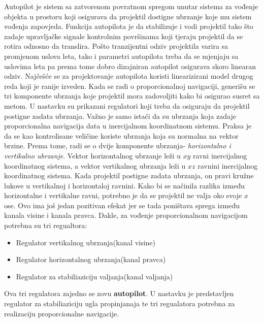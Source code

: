 Autopilot je sistem sa zatvorenom povratnom spregom unutar sistema za vođenje objekta 
u prostoru koji osigurava da projektil dostigne ubrzanje koje mu sistem vođenja zapovjeda. 
Funkcija autopilota je da stabilizuje i vodi projektil tako što zadaje upravljačke signale kontrolnim 
površinama koji tjeraju projektil da se rotira odnosno da translira.  
Pošto tranzijentni odziv projektila varira sa promjenom uslova leta, tako i parametri 
autopilota treba da se mjenjaju sa uslovima leta pa prema tome dobro 
dizajniran autopilot osigurava skoro linearan odziv. Najčešće se za projektovanje 
autopilota koristi linearizirani model drugog reda koji je ranije izveden. 
Kada se radi o proporcionalnoj navigaciji, generišu se tri komponente ubrzanja koje projektil mora 
zadovoljiti kako bi osigurao susret sa metom. U nastavku su prikazani regulatori koji 
treba da osiguraju da projektil postigne zadata ubrzanja. Važno je samo istaći 
da su ubrzanja koja zadaje proporcionalna navigacija data u inercijalnom koordinatnom sistemu. Praksa 
je da se kao kontrolisane veličine koriste ubrzanja koja su normalna na vektor brzine. Prema tome, 
radi se o dvije komponente ubrzanja- \textit{horizontalno i vertikalno ubrzanje}. Vektor horizontalnog ubrzanje 
leži u $xy$ ravni inercijalnog koordinatnog sistema, a vektor vertikalnog ubrzanja leži u $xz$ ravnini inercijalnog
koordinatnog sistema. Kada projektil postigne zadata ubrzanja, on pravi kružne lukove u vertikalnoj i 
horizontaloj ravnini. Kako bi se načinila razlika između horizontalne i vertikalne ravni, potrebno je 
da se projektil ne valja oko svoje $x$ ose. Ovo ima još jedan pozitivan efekat jer se tada poništava 
sprega između kanala visine i kanala pravca. Dakle, za vođenje proporcionalnom 
navigacijom potrebna su tri regualtora:
\begin{itemize}
    \item Regulator vertikalnog ubrzanja(kanal visine)
    \item Regulator horizontalnog ubrzanja(kanal pravca)
    \item Regulator za stabiliaziciju valjanja(kanal valjanja)
\end{itemize}
Ova tri regulatora zajedno se zovu \textbf{autopilot}. 
U nastavku je predstavljen regulator za stabiliaziciju ugla propinjanaja te tri regualatora potrebna 
za realizaciju proporcionalne navigacije. 
